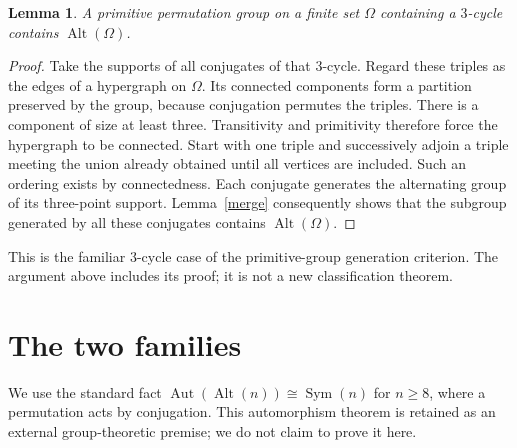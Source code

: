 \documentclass[11pt,a4paper]{article}
\newtheorem{lemma}{Lemma}
\newcommand{\Alt}{\operatorname{Alt}}
\newcommand{\Sym}{\operatorname{Sym}}
\begin{document}
\begin{lemma}\label{primitive}
A primitive permutation group on a finite set $\Omega$ containing a
$3$-cycle contains $\Alt(\Omega)$.
\end{lemma}
\begin{proof}
Take the supports of all conjugates of that $3$-cycle. Regard these triples
as the edges of a hypergraph on $\Omega$. Its connected components form a
partition preserved by the group, because conjugation permutes the triples.
There is a component of size at least three. Transitivity and primitivity
therefore force the hypergraph to be connected. Start with one triple and
successively adjoin a triple meeting the union already obtained until all
vertices are included. Such an ordering exists by connectedness.
Each conjugate generates the alternating group of its three-point support.
Lemma~\ref{merge} consequently shows that the subgroup generated by all
these conjugates contains $\Alt(\Omega)$.
\end{proof}
This is the familiar $3$-cycle case of the primitive-group generation
criterion. The argument above includes its proof; it is not a new
classification theorem.

\section{The two families}
We use the standard fact $\operatorname{Aut}(\Alt(n))\cong\Sym(n)$ for
$n\geq8$, where a permutation acts by conjugation. This automorphism
theorem is retained as an external group-theoretic premise; we do not claim
to prove it here.
\end{document}
